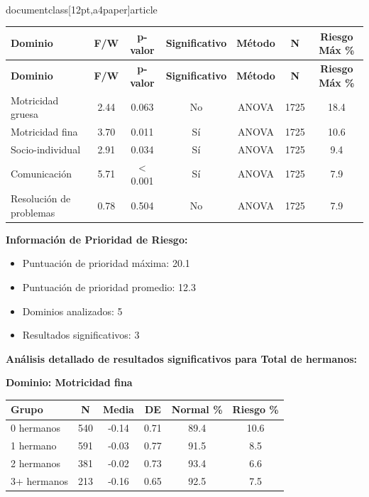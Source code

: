 \\documentclass[12pt,a4paper]{article}
\begin{document}
\begin{longtable}{|l|c|c|c|c|c|c|}
\hline
\textbf{Dominio} & \textbf{F/W} & \textbf{p-valor} & \textbf{Significativo} & \textbf{Método} & \textbf{N} & \textbf{Riesgo Máx \%} \\
\hline
\endfirsthead

\hline
\textbf{Dominio} & \textbf{F/W} & \textbf{p-valor} & \textbf{Significativo} & \textbf{Método} & \textbf{N} & \textbf{Riesgo Máx \%} \\
\hline
\endhead

\hline
\endfoot

\hline
\endlastfoot

Motricidad gruesa & 2.44 & 0.063 & No & ANOVA & 1725 & 18.4 \\
Motricidad fina & 3.70 & 0.011 & Sí & ANOVA & 1725 & 10.6 \\
Socio-individual & 2.91 & 0.034 & Sí & ANOVA & 1725 & 9.4 \\
Comunicación & 5.71 & < 0.001 & Sí & ANOVA & 1725 & 7.9 \\
Resolución de problemas & 0.78 & 0.504 & No & ANOVA & 1725 & 7.9 \\

\end{longtable}


\textbf{Información de Prioridad de Riesgo:}
\begin{itemize}
\item Puntuación de prioridad máxima: 20.1
\item Puntuación de prioridad promedio: 12.3
\item Dominios analizados: 5
\item Resultados significativos: 3
\end{itemize}


\textbf{Análisis detallado de resultados significativos para Total de hermanos:}


\textbf{Dominio: Motricidad fina}


\begin{center}
\begin{tabular}{|l|c|c|c|c|c|}
\hline
\textbf{Grupo} & \textbf{N} & \textbf{Media} & \textbf{DE} & \textbf{Normal \%} & \textbf{Riesgo \%} \\
\hline
0 hermanos & 540 & -0.14 & 0.71 & 89.4 & 10.6 \\
1 hermano & 591 & -0.03 & 0.77 & 91.5 & 8.5 \\
2 hermanos & 381 & -0.02 & 0.73 & 93.4 & 6.6 \\
3+ hermanos & 213 & -0.16 & 0.65 & 92.5 & 7.5 \\

\hline
\end{tabular}
\end{center}
\end{document}
